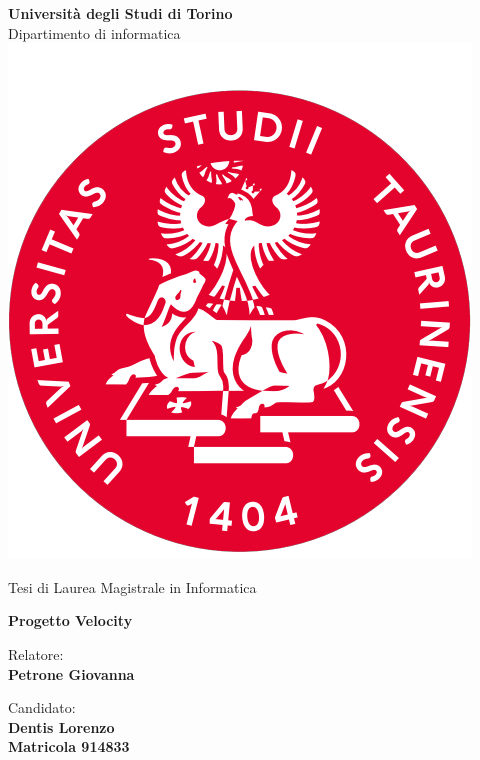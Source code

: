 \begin{titlepage}

\begin{center}
    \textbf{\huge{Università degli Studi di Torino}}
    \vspace{2mm}
    \\ \LARGE{Dipartimento di informatica}
    \vspace{5mm}
    \\ \includegraphics[keepaspectratio=true,scale=0.4]{images/unito_logo.png}
    \vspace{5mm}
\end{center}

\begin{center}
    \LARGE{Tesi di Laurea Magistrale in Informatica} 
\end{center}

\vspace{15mm}
\begin{center}
    \textbf{\huge{ Progetto Velocity }}
\end{center}
\vspace{30mm}

\begin{minipage}[t]{0.47\textwidth}
	{\large{Relatore:}{\normalsize\vspace{3mm}
	\bf\\ \large{Petrone Giovanna} \normalsize\vspace{3mm}\bf}}
\end{minipage}
\hfill
\begin{minipage}[t]{0.47\textwidth}\raggedleft
	{\large{Candidato:}{\normalsize\vspace{3mm} \bf\\ \large{Dentis Lorenzo} \\ \small{Matricola 914833}}}
\end{minipage}

\vspace{40 mm}
\hrulefill
\\ 

\end{titlepage}